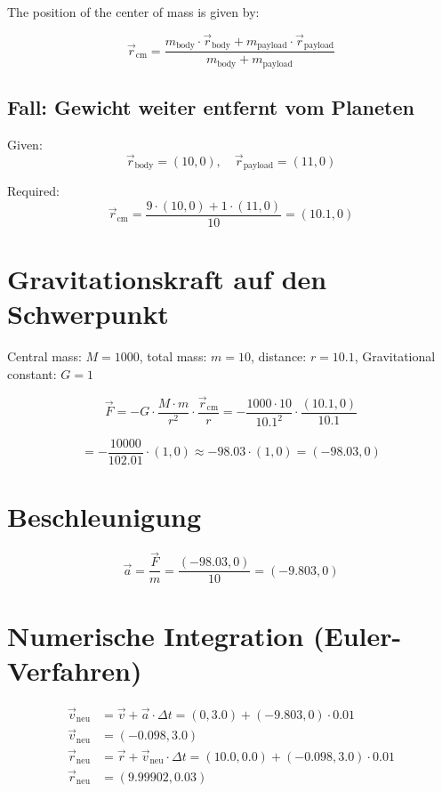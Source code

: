 \documentclass[conference]{IEEEtran}
\begin{document}
The position of the center of mass is given by:

\[
\vec{r}_\text{cm} = \frac{m_\text{body} \cdot \vec{r}_\text{body} + m_\text{payload} \cdot \vec{r}_\text{payload}}{m_\text{body} + m_\text{payload}}
\]

\subsection*{Fall: Gewicht weiter entfernt vom Planeten}

Given:
\[
\vec{r}_\text{body} = (10, 0), \quad \vec{r}_\text{payload} = (11, 0)
\]

Required:
\[
\vec{r}_\text{cm} = \frac{9 \cdot (10, 0) + 1 \cdot (11, 0)}{10} = (10.1, 0)
\]

\section{Gravitationskraft auf den Schwerpunkt}

Central mass: \( M = 1000 \), total mass: \( m = 10 \), distance: \( r = 10.1 \), Gravitational constant: \( G = 1 \)

\[
\vec{F} = - G \cdot \frac{M \cdot m}{r^2} \cdot \frac{\vec{r}_\text{cm}}{r}
= - \frac{1000 \cdot 10}{10.1^2} \cdot \frac{(10.1, 0)}{10.1}
\]

\[
= - \frac{10000}{102.01} \cdot (1, 0) \approx -98.03 \cdot (1, 0) = (-98.03, 0)
\]

\section{Beschleunigung}

\[
\vec{a} = \frac{\vec{F}}{m} = \frac{(-98.03, 0)}{10} = (-9.803, 0)
\]

\section{Numerische Integration (Euler-Verfahren)}

\begin{align*}
\vec{v}_\text{neu} &= \vec{v} + \vec{a} \cdot \Delta t = (0, 3.0) + (-9.803, 0) \cdot 0.01  \\
\vec{v}_\text{neu} &= (-0.098, 3.0) \\
\vec{r}_\text{neu} &= \vec{r} + \vec{v}_\text{neu} \cdot \Delta t = (10.0, 0.0) + (-0.098, 3.0) \cdot 0.01 \\
\vec{r}_\text{neu} &=(9.99902, 0.03)
\end{align*}
\end{document}
